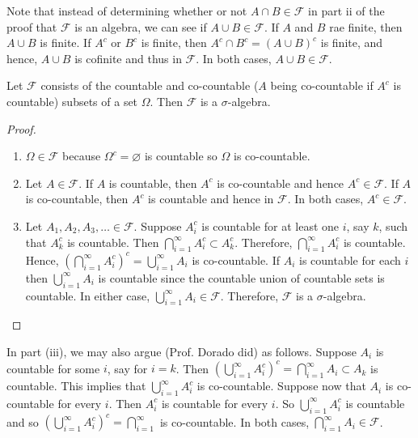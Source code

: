 Note that instead of determining whether or not $A\cap B\in \mathcal F$ in part ii of the proof that $\mathcal F$ is an algebra, we can see if $A\cup B\in \mathcal F$. If $A$ and $B$ rae finite, then $A\cup B$ is finite. If $A^c$ or $B^c$ is finite, then $A^c\cap B^c=(A\cup B)^c$ is finite, and hence, $A\cup B$ is cofinite and thus in $\mathcal F$. In both cases, $A\cup B\in \mathcal F$.


\begin{example}
Let $\mathcal F$ consists of the countable and co-countable ($A$ being co-countable if $A^c$ is countable) subsets of a set $\Omega$. Then $\mathcal F$ is a $\sigma$-algebra.
\end{example}


\begin{proof}
\begin{enumerate}[label=(\emph{\roman*})]
\item $\Omega\in\mathcal F$ because $\Omega^c=\varnothing$ is countable so $\Omega$ is co-countable.
\item Let $A\in \mathcal F$. If $A$ is countable, then $A^c$ is co-countable and hence $A^c\in \mathcal F$. If $A$ is co-countable, then $A^c$ is countable and hence in $\mathcal F$. In both cases, $A^c\in\mathcal F$.
\item Let $A_1, A_2, A_3, \ldots \in \mathcal F$. Suppose $A_i^c$ is countable for at least one $i$, say $k$, such that $A_k^c$ is countable. Then $\bigcap_{i=1}^\infty A_i^c\subset A_k^c$. Therefore, $\bigcap_{i=1}^\infty A_i^c$ is countable. Hence, $\left(\bigcap_{i=1}^\infty A_i^c\right)^c=\bigcup_{i=1}^\infty A_i$ is co-countable. If $A_i$ is countable for each $i$ then $\bigcup_{i=1}^\infty A_i$ is countable since the countable union of countable sets is countable. In either case, $\bigcup_{i=1}^\infty A_i\in \mathcal F$. Therefore, $\mathcal F$ is a $\sigma$-algebra.
\end{enumerate}
\end{proof}

In part (iii), we may also argue (Prof. Dorado did) as follows. Suppose $A_i$ is countable for some $i$, say for $i=k$. Then $\left(\bigcup_{i=1}^\infty A_i^c\right)^c=\bigcap_{i=1}^\infty A_i\subset A_k$ is countable. This implies that $\bigcup_{i=1}^\infty A_i^c$ is co-countable. Suppose now that $A_i$ is co-countable for every $i$. Then $A_i^c$ is countable for every $i$. So $\bigcup_{i=1}^\infty A_i^c$ is countable and so $\left(\bigcup_{i=1}^\infty A_i^c\right)^c=\bigcap_{i=1}^\infty$ is co-countable. In both cases, $\bigcap_{i=1}^\infty A_i\in\mathcal F$. 


